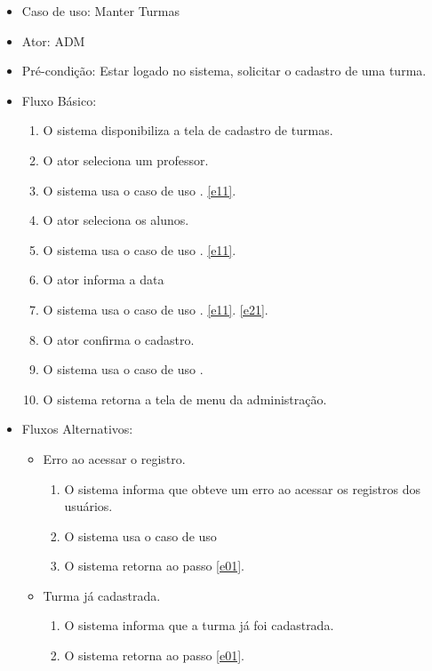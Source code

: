 \documentclass{utfpr-pg}
\begin{document}
    \begin{itemize}
        \item Caso de uso: Manter Turmas
        \item Ator: ADM
        \item Pré-condição: Estar logado no sistema, solicitar o cadastro de uma turma.
        \item Fluxo Básico:
        \begin{enumerate}[label=\textbf{\arabic*}]
            \item \label{e01} O sistema disponibiliza a tela de cadastro de turmas.
            \item O ator seleciona um professor.
            \item O sistema usa o caso de uso \textbf{\textit{}}. \ref{e11}.
            \item O ator seleciona os alunos.
            \item O sistema usa o caso de uso \textbf{\textit{}}. \ref{e11}.
            \item O ator informa a data
            \item O sistema usa o caso de uso \textbf{\textit{}}. \ref{e11}. \ref{e21}.
            \item O ator confirma o cadastro.
            \item O sistema usa o caso de uso \textbf{\textit{}}.
            \item O sistema retorna a tela de menu da administração.
            
        \end{enumerate}
        
        \item Fluxos Alternativos:
        \begin{itemize}
            \item Erro ao acessar o registro.
            \begin{enumerate}[label=\textbf{3.\arabic*}]
                \item \label{e11} O sistema informa que obteve um erro ao acessar os registros dos usuários.
                \item O sistema usa o caso de uso \textbf{\textit{}}
                \item O sistema retorna ao passo \ref{e01}.
            \end{enumerate}
            
            \item Turma já cadastrada.
            \begin{enumerate}[label=\textbf{7.\arabic*}]
                \item \label{e21} O sistema informa que a turma já foi cadastrada.
                \item O sistema retorna ao passo \ref{e01}.
            \end{enumerate}
            
        \end{itemize}
        
    \end{itemize}
\end{document}
